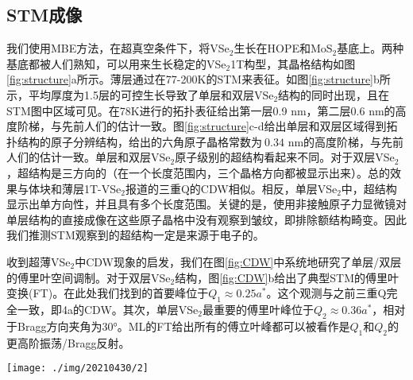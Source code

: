 \documentclass[reprint, aps, prb, showkeys]{revtex4-2}
\begin{document}
\subsection{STM成像}
我们使用MBE方法，在超真空条件下，将VSe$_2$生长在HOPE和MoS$_2$基底上。两种基底都被人们熟知，可以用来生长稳定的VSe$_2$1T构型，其晶格结构如图\ref{fig:structure}a所示。薄层通过在77-200K的STM来表征。如图\ref{fig:structure}b所示，平均厚度为1.5层的可控生长导致了单层和双层VSe$_2$结构的同时出现，且在STM图中区域可见。在78K进行的拓扑表征给出第一层0.9 nm，第二层0.6 nm的高度阶梯，与先前人们的估计一致。图\ref{fig:structure}c-d给出单层和双层区域得到拓扑结构的原子分辨结构，给出的六角原子晶格常数为$~ 0.34$ nm的高度阶梯，与先前人们的估计一致。单层和双层VSe$_2$原子级别的超结构看起来不同。对于双层VSe$_2$，超结构是三方向的（在一个长度范围内，三个晶格方向都被显示出来）。总的效果与体块和薄层1T-VSe$_2$报道的三重Q的CDW相似。相反，单层VSe$_2$中，超结构显示出单方向性，并且具有多个长度范围。关键的是，使用非接触原子力显微镜对单层结构的直接成像在这些原子晶格中没有观察到皱纹，即排除额结构畸变。因此我们推测STM观察到的超结构一定是来源于电子的。

收到超薄VSe$_2$中CDW现象的启发，我们在图\ref{fig:CDW}中系统地研究了单层/双层的傅里叶空间调制。对于双层VSe$_2$结构，图\ref{fig:CDW}b给出了典型STM的傅里叶变换(FT)。在此处我们找到的首要峰位于$Q_1 \approx 0.25 a^{*}$。这个观测与之前三重Q完全一致，即4a的CDW。其次，单层VSe$_2$最重要的傅里叶峰位于$Q_2 \approx 0.36 a^{*}$，相对于Bragg方向夹角为30°。ML的FT给出所有的傅立叶峰都可以被看作是$Q_1$和$Q_2$的更高阶振荡/Bragg反射。
\begin{figure*}[t]
    \texttt{[image: ./img/20210430/2]}
    \caption{\label{fig:CDW} 
    双层/单层VSe$_2$的CDW。(a-d)STM图样和其傅里叶变换。(a, c)中的虚线代表实空间CDW波前，对应在(b, d)中的圈代表了CDW波矢$Q_1$和$Q_2$，红色圈代表了所有FT图像中的Bragg峰。(e)116K得到的单层VSe$_2$STM图像的FT，紫红色代表$Q_2$峰，$Q_1$峰则发生缺失。虚线代表$Q_2$的方向与Bragg峰的对应关系。(f)单层VSe$_2$在78 K时的FT，绿色和紫红色代表主要的CDW峰。有颜色的箭头代表其与Bragg峰的对应关系。
    }
\end{figure*}
\end{document}
